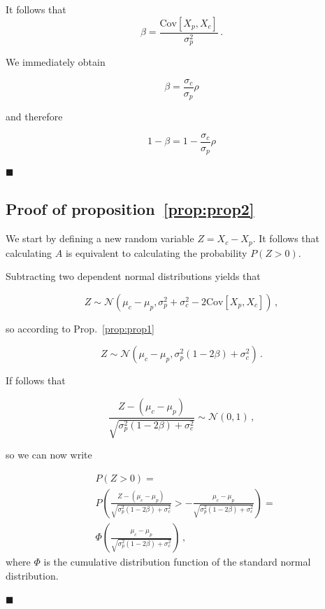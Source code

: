 \documentclass[12pt,times,letter]{article}
\newcommand*{\qed}{\hfill\ensuremath{\blacksquare}}%
\newcommand{\pref}[1]{Prop.~\ref{prop:#1}}
\newcommand{\preflong}[1]{proposition~\ref{prop:#1}}
\newcommand{\be}{\begin{equation}}
\newcommand{\ee}{\end{equation}}
\numberwithin{equation}{section}
\begin{document}
It follows that 
\be
\beta = \frac{\text{Cov}\left[X_p,X_c\right]}{\sigma_p^2}\,.
\ee

We immediately obtain

\be
\beta = \frac{\sigma_c}{\sigma_p}\rho
\ee

and therefore

\be
1-\beta = 1-\frac{\sigma_c}{\sigma_p}\rho
\ee

\qed

\subsection{Proof of \preflong{prop2}}

We start by defining a new random variable $Z = X_c-X_p$. It follows that calculating $A$ is equivalent to calculating the probability $P\left(Z>0\right)$.

Subtracting two dependent normal distributions yields that

\be
Z \sim \mathcal{N}\left(\mu_c - \mu_p,\sigma_p^2 + \sigma_c^2 - 2\text{Cov}\left[X_p,X_c\right]\right)\,,
\ee

so according to \pref{prop1}

\be
Z \sim \mathcal{N}\left(\mu_c - \mu_p,\sigma_p^2\left(1-2\beta\right) + \sigma_c^2\right)\,.
\ee

If follows that

\be
\frac{Z - \left(\mu_c - \mu_p\right)}{\sqrt{\sigma_p^2\left(1-2\beta\right) + \sigma_c^2}} \sim \mathcal{N}\left(0,1\right)\,,
\ee

so we can now write

\be
\begin{split}
&P\left(Z>0\right) = \\ & P\left(\frac{Z - (\mu_c - \mu_p)}{\sqrt{\sigma_p^2\left(1-2\beta\right) + \sigma_c^2}} > -\frac{\mu_c - \mu_p}{\sqrt{\sigma_p^2\left(1-2\beta\right) + \sigma_c^2}} \right) = \\ &\Phi\left(\frac{\mu_c - \mu_p}{\sqrt{\sigma_p^2\left(1 - 2\beta\right) + \sigma_c^2}}\right) \,,
\end{split}
\ee
where $\Phi$ is the cumulative distribution function of the standard normal distribution.

\qed
\end{document}
